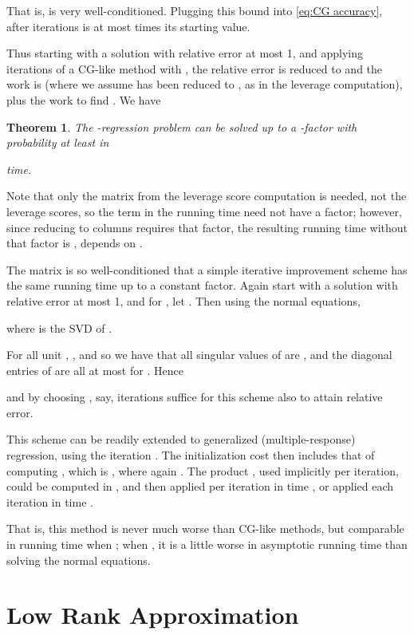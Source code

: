 \documentclass{sig-alternate}
\newtheorem{theorem}{Theorem}
\begin{document}
That is,  is very well-conditioned. Plugging this
bound into \eqref{eq:CG accuracy}, after  iterations
 is at most 
times its starting value.

Thus starting with a solution  with 
relative error at most 1, and applying  iterations
of a CG-like method with , the relative error is reduced to 
and the work is 
(where we assume  has been reduced to , as in the leverage computation),
plus the work to find . We have
\fi

\begin{theorem}\label{thm:it reg}
The -regression problem can be solved up to a -factor with probability at least 
 in

time.
\end{theorem}

\ifSTOC\else

Note that only the matrix  from the leverage score computation is needed, not
the leverage scores, so the  term in the running time 
need not have a 
factor; however, since reducing  to  columns requires that factor,
the resulting running time without that factor
is ,
depends on .


The matrix  is so well-conditioned that a simple iterative improvement scheme
has the same running time up to a constant factor. Again start with a solution  with 
relative error at most 1, and for ,
let .
Then using the normal equations,

where  is the SVD of .

For all unit ,
, and so
we have that all singular values  of  are ,
and the diagonal entries of 
are all at most  for 
. Hence 

and by choosing , say,  iterations suffice for this
scheme also to attain  relative error.

This scheme can be readily extended to generalized (multiple-response)
regression, using the iteration
.
The initialization cost then includes that of computing
, which is ,
where again . The product ,
used implicitly per iteration, could be computed in ,
and then applied per iteration in time ,
or applied each iteration in time . 

That is, this method is never much worse than CG-like methods, but
comparable in running time when ; when ,
it is a little worse in asymptotic running time than solving the normal equations.
\fi 


\section{Low Rank Approximation}\label{sec:low rank}
\end{document}

